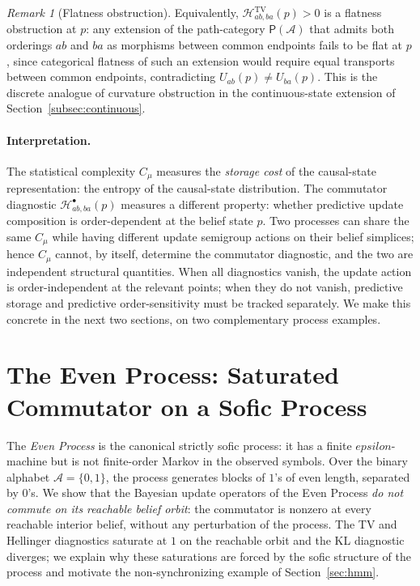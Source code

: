 \documentclass[11pt,a4paper]{article}
\def\varepsilon{epsilon}%
\theoremstyle{plain}
\theoremstyle{definition}
\theoremstyle{remark}
\newtheorem{remark}[theorem]{Remark}
\newcommand{\PathCat}{\mathsf{P}}
\newcommand{\Alphabet}{\mathcal{A}}
\begin{document}
\begin{remark}[Flatness obstruction]
\label{rem:flatness}
Equivalently, $\mathcal{H}^{\mathrm{TV}}_{ab,ba}(p) > 0$ is a flatness obstruction at $p$: any extension of the path-category $\PathCat(\Alphabet)$ that admits both orderings $ab$ and $ba$ as morphisms between common endpoints fails to be flat at $p$, since categorical flatness of such an extension would require equal transports between common endpoints, contradicting $U_{ab}(p) \neq U_{ba}(p)$. This is the discrete analogue of curvature obstruction in the continuous-state extension of Section~\ref{subsec:continuous}.
\end{remark}

\paragraph{Interpretation.}
The statistical complexity $C_\mu$ measures the \emph{storage cost} of the causal-state representation: the entropy of the causal-state distribution. The commutator diagnostic $\mathcal{H}^{\bullet}_{ab,ba}(p)$ measures a different property: whether predictive update composition is order-dependent at the belief state $p$. Two processes can share the same $C_\mu$ while having different update semigroup actions on their belief simplices; hence $C_\mu$ cannot, by itself, determine the commutator diagnostic, and the two are independent structural quantities. When all diagnostics vanish, the update action is order-independent at the relevant points; when they do not vanish, predictive storage and predictive order-sensitivity must be tracked separately. We make this concrete in the next two sections, on two complementary process examples.

\section{The Even Process: Saturated Commutator on a Sofic Process}
\label{sec:even}

The \emph{Even Process} is the canonical strictly sofic process: it has a finite $\varepsilon$-machine but is not finite-order Markov in the observed symbols. Over the binary alphabet $\Alphabet = \{0, 1\}$, the process generates blocks of $1$'s of even length, separated by $0$'s. We show that the Bayesian update operators of the Even Process \emph{do not commute on its reachable belief orbit}: the commutator is nonzero at every reachable interior belief, without any perturbation of the process. The TV and Hellinger diagnostics saturate at $1$ on the reachable orbit and the KL diagnostic diverges; we explain why these saturations are forced by the sofic structure of the process and motivate the non-synchronizing example of Section~\ref{sec:hmm}.
\end{document}

